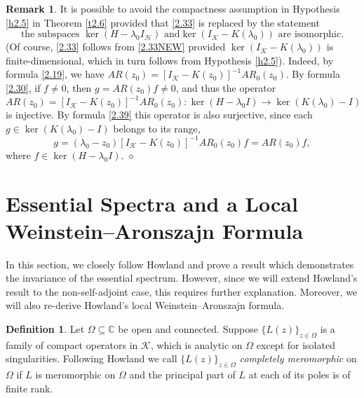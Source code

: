 \documentclass[reqno,10pt, centertags]{amsart}
\newcommand{\bbC}{{\mathbb{C}}}
\newcommand{\cH}{{\mathcal H}}
\newcommand{\cK}{{\mathcal K}}
\newcommand{\lb}{\label}
\numberwithin{equation}{section}
\theoremstyle{definition}
\newtheorem{definition}[theorem]{Definition}
\newtheorem{remark}[theorem]{Remark}
\begin{document}
\begin{remark}
It is possible to avoid the compactness assumption in Hypothesis \ref{h2.5}
in Theorem \ref{t2.6} provided that \eqref{2.33} is replaced by the
statement
\begin{equation}\label{2.33NEW}
\text{the subspaces $\ker(H-\lambda_0I_{\cH})$ and
$\ker(I_{\cK}-K(\lambda_0))$ are isomorphic.}
\end{equation}
(Of course, \eqref{2.33} follows from \eqref{2.33NEW} provided
$\ker(I_{\cK}-K(\lambda_0))$ is finite-dimensional, which in turn follows
from Hypothesis \ref{h2.5}). Indeed, by formula \eqref{2.19}, we have
$AR(z_0)=[I_{\cK}-K(z_0)]^{-1}AR_0(z_0)$. By formula \eqref{2.30},
if $f\neq 0$, then $g=AR(z_0)f\neq 0$, and thus the operator
\begin{equation}
AR(z_0)=[I_{\cK}-K(z_0)]^{-1}AR_0(z_0) \colon
\ker(H-\lambda_0I)\to\ker(K(\lambda_0)-I)
\end{equation}
is injective. By formula \eqref{2.39} this operator is also surjective,
since each $g\in\ker(K(\lambda_0)-I)$ belongs to its range,
\begin{equation}
g=(\lambda_0-z_0)[I_{\cK}-K(z_0)]^{-1}AR_0(z_0)f=AR(z_0)f,
\end{equation}
where $f\in\ker(H-\lambda_0I)$. \hfill $\diamond$
\end{remark}


\section{Essential Spectra and a Local Weinstein--Aronszajn Formula}
\lb{s4}

In this section, we closely follow Howland \cite{Ho70} and prove
a result which demonstrates the invariance of the essential spectrum.
However, since we will extend Howland's result to the
non-self-adjoint case, this requires further explanation. Moreover, we
will also re-derive Howland's local Weinstein--Aronszajn formula.

\begin{definition} \lb{d2.7}
Let $\Omega\subseteq\bbC$ be open and connected. Suppose
$\{L(z)\}_{z\in\Omega}$ is a family of compact operators in $\cK$, which is
analytic on $\Omega$ except for isolated singularities. Following Howland
we call $\{L(z)\}_{z\in\Omega}$ {\it completely meromorphic} on $\Omega$ if
$L$ is meromorphic on $\Omega$ and the principal part of
$L$ at each of its poles is of finite rank.
\end{definition}
\end{document}
